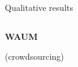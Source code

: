 


\begin{frame}{Qualitative results}{}
    \begin{columns}
    \begin{column}{.3\textwidth}
        \textbf{WAUM}

        (crowdsourcing)

        \vspace{.25cm}


\end{column}
\end{columns}
\end{frame}
